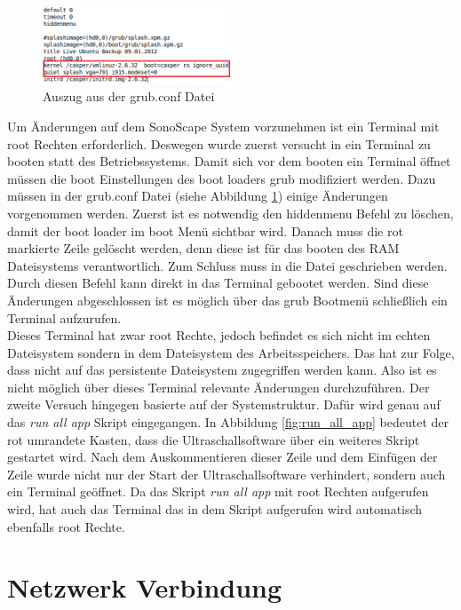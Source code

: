 \begin{figure}
\centering  	
\includegraphics[width=0.5\textwidth]{Sonoscape_Analyse/grub_conf} 
		\caption{{\small Auszug aus der grub.conf Datei}}
		\label{fig:grub_conf}
\end{figure}
Um Änderungen auf dem SonoScape System vorzunehmen ist ein Terminal mit root Rechten erforderlich. Deswegen wurde zuerst versucht in ein Terminal zu booten statt des Betriebssystems. Damit sich vor dem booten ein Terminal öffnet müssen die boot Einstellungen des boot loaders grub modifiziert werden. Dazu müssen in der grub.conf Datei (siehe Abbildung \ref{fig:grub_conf}) einige Änderungen vorgenommen werden. Zuerst ist es notwendig den hiddenmenu Befehl zu löschen, damit der boot loader im boot Menü sichtbar wird.
Danach muss die rot markierte Zeile gelöscht werden, denn diese ist für das booten des RAM Dateisystems verantwortlich. Zum Schluss muss 
 in die Datei geschrieben werden. Durch diesen Befehl kann direkt in das Terminal gebootet werden. Sind diese Änderungen abgeschlossen ist es möglich über das grub Bootmenü schließlich ein Terminal aufzurufen.\\
Dieses Terminal hat zwar root Rechte, jedoch befindet es sich nicht im echten Dateisystem sondern in dem Dateisystem des Arbeitsspeichers. Das hat zur Folge, dass nicht auf das persistente Dateisystem zugegriffen werden kann. Also ist es nicht möglich über dieses Terminal relevante Änderungen durchzuführen.
Der zweite Versuch hingegen basierte auf der Systemstruktur. Dafür wird genau auf das \textit{run all app} Skript eingegangen. In Abbildung \ref{fig:run_all_app} bedeutet der rot umrandete Kasten, dass die Ultraschallsoftware über ein weiteres Skript gestartet wird. Nach dem Auskommentieren dieser Zeile und dem Einfügen der Zeile  wurde nicht nur der Start der Ultraschallsoftware verhindert, sondern auch ein Terminal geöffnet. Da das Skript \textit{run all app} mit root Rechten aufgerufen wird, hat auch das Terminal das in dem Skript aufgerufen wird automatisch ebenfalls root Rechte.

\section{Netzwerk Verbindung}

